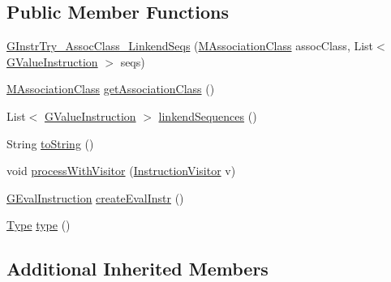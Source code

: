 \subsection*{Public Member Functions}
\begin{DoxyCompactItemize}
\item 
\hyperlink{classorg_1_1tzi_1_1use_1_1gen_1_1assl_1_1statics_1_1_g_instr_try___assoc_class___linkend_seqs_a6f38cff115f7c0407fe310895c02a87e}{G\-Instr\-Try\-\_\-\-Assoc\-Class\-\_\-\-Linkend\-Seqs} (\hyperlink{interfaceorg_1_1tzi_1_1use_1_1uml_1_1mm_1_1_m_association_class}{M\-Association\-Class} assoc\-Class, List$<$ \hyperlink{interfaceorg_1_1tzi_1_1use_1_1gen_1_1assl_1_1statics_1_1_g_value_instruction}{G\-Value\-Instruction} $>$ seqs)
\item 
\hyperlink{interfaceorg_1_1tzi_1_1use_1_1uml_1_1mm_1_1_m_association_class}{M\-Association\-Class} \hyperlink{classorg_1_1tzi_1_1use_1_1gen_1_1assl_1_1statics_1_1_g_instr_try___assoc_class___linkend_seqs_afda3b1358a2226e72d5591851f5538d8}{get\-Association\-Class} ()
\item 
List$<$ \hyperlink{interfaceorg_1_1tzi_1_1use_1_1gen_1_1assl_1_1statics_1_1_g_value_instruction}{G\-Value\-Instruction} $>$ \hyperlink{classorg_1_1tzi_1_1use_1_1gen_1_1assl_1_1statics_1_1_g_instr_try___assoc_class___linkend_seqs_ad60b1050ce95d8d773fdcd8403e9191c}{linkend\-Sequences} ()
\item 
String \hyperlink{classorg_1_1tzi_1_1use_1_1gen_1_1assl_1_1statics_1_1_g_instr_try___assoc_class___linkend_seqs_a8c37ebd575ef3b5ed59740117098966e}{to\-String} ()
\item 
void \hyperlink{classorg_1_1tzi_1_1use_1_1gen_1_1assl_1_1statics_1_1_g_instr_try___assoc_class___linkend_seqs_a0a449973fe2de1c040184df13ef194f0}{process\-With\-Visitor} (\hyperlink{interfaceorg_1_1tzi_1_1use_1_1gen_1_1assl_1_1statics_1_1_instruction_visitor}{Instruction\-Visitor} v)
\item 
\hyperlink{classorg_1_1tzi_1_1use_1_1gen_1_1assl_1_1dynamics_1_1_g_eval_instruction}{G\-Eval\-Instruction} \hyperlink{classorg_1_1tzi_1_1use_1_1gen_1_1assl_1_1statics_1_1_g_instr_try___assoc_class___linkend_seqs_a3542930155537155cb3ffbd447e1fb06}{create\-Eval\-Instr} ()
\item 
\hyperlink{interfaceorg_1_1tzi_1_1use_1_1uml_1_1ocl_1_1type_1_1_type}{Type} \hyperlink{classorg_1_1tzi_1_1use_1_1gen_1_1assl_1_1statics_1_1_g_instr_try___assoc_class___linkend_seqs_acd4e20447ed931cbb54f27d59dbff50e}{type} ()
\end{DoxyCompactItemize}
\subsection*{Additional Inherited Members}


